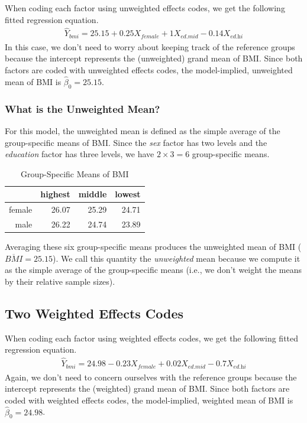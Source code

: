 \documentclass{article}\usepackage[]{graphicx}\usepackage[]{color}
\begin{document}
When coding each factor using unweighted effects codes, we get the following
fitted regression equation.
\begin{align*}
  \hat{Y}_{\textit{bmi}} = 
  25.15 +
  0.25X_{\textit{female}} + 
  1X_{\textit{ed.mid}} 
  -0.14X_{\textit{ed.hi}}
\end{align*}
In this case, we don't need to worry about keeping track of the reference groups
because the intercept represents the (unweighted) grand mean of BMI. Since both
factors are coded with unweighted effects codes, the model-implied, unweighted
mean of BMI is $\hat{\beta}_0 = 25.15$.

\subsubsection{What is the Unweighted Mean?}
For this model, the unweighted mean is defined as the simple average of the
group-specific means of BMI. Since the \emph{sex} factor has two levels and the
\emph{education} factor has three levels, we have $2 \times 3 = 6$
group-specific means.

\begin{table}[ht]
\centering
\begin{tabular}{rrrr}
  \toprule
 & highest & middle & lowest \\ 
  \midrule
female & 26.07 & 25.29 & 24.71 \\ 
  male & 26.22 & 24.74 & 23.89 \\ 
   \bottomrule
\end{tabular}
\caption{Group-Specific Means of BMI} 
\label{mTab}
\end{table}


Averaging these six group-specific means produces the unweighted mean of BMI
($\overline{\textit{BMI}} = 25.15$). We call this
quantity the \emph{unweighted} mean because we compute it as the simple average
of the group-specific means (i.e., we don't weight the means by their relative
sample sizes).

\subsection{Two Weighted Effects Codes}



When coding each factor using weighted effects codes, we get the following
fitted regression equation.
\begin{align*}
  \hat{Y}_{\textit{bmi}} = 
  24.98 
  -0.23X_{\textit{female}} + 
  0.02X_{\textit{ed.mid}} 
  -0.7X_{\textit{ed.hi}}
\end{align*}
Again, we don't need to concern ourselves with the reference groups because the
intercept represents the (weighted) grand mean of BMI. Since both factors are
coded with weighted effects codes, the model-implied, weighted mean of BMI is
$\hat{\beta}_0 = 24.98$.
\end{document}
